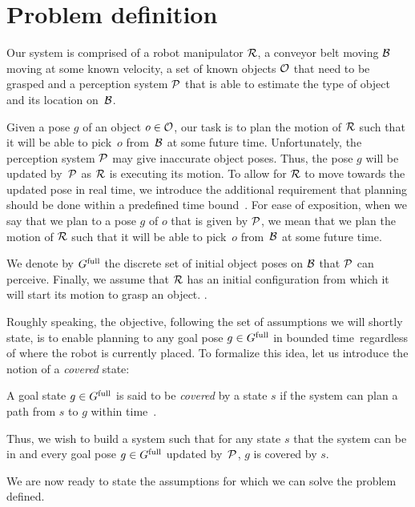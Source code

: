 \documentclass[conference]{IEEEtran}
\begin{document}
\section{Problem definition}
Our system is comprised of 
a robot manipulator $\mathcal{R}$,
a conveyor belt moving $\mathcal{B}$ moving at some known velocity,
a set of known objects $\mathcal{O}$ that need to be grasped and 
a perception system $\mathcal{P}$ that is able to estimate the type of object and its location on~$\mathcal{B}$.

Given a pose $g$ of an object $o \in \mathcal{O}$, our task is to plan the motion of $\mathcal{R}$ such that it will be able to pick~$o$ from~$\mathcal{B}$ at some future time.
%
Unfortunately, the perception system $\mathcal{P}$ may give inaccurate object poses.
Thus, the pose $g$ will be updated by~$\mathcal{P}$ as $\mathcal{R}$ is executing its motion. 
To allow for $\mathcal{R}$ to move towards the updated pose in real time, we introduce the additional requirement that planning should be done within a predefined time bound~\Tbound.
%
For ease of exposition, when we say that we plan to a pose $g$ of $o$ that is given by $\mathcal{P}$, 
we mean that we plan the motion of $\mathcal{R}$ such that it will be able to pick~$o$ from~$\mathcal{B}$ at some future time. 

%
We denote by $G^{\textrm{full}}$ the discrete set of initial object poses on $\mathcal{B}$ that $\mathcal{P}$ can perceive.
%
Finally, we assume that $\mathcal{R}$ has an initial configuration \Shome from which it will start its motion to grasp an object.
.

Roughly speaking, the objective, following the set of assumptions we will shortly state, is to enable planning to any goal pose $ g \in G^{\textrm{full}}$ in bounded time~\Tbound regardless of where the robot is currently placed.
To formalize this idea, let us introduce the notion of a \emph{covered} state:
\begin{definition}
    A goal state $g \in G^{\textrm{full}}$ is said to be \emph{covered} by a state $s$ if 
    the system can plan a path from $s$ to $g$ within time~\Tbound.
\end{definition}

Thus, we wish to build a system such that 
for any state $s$ that the system can be in 
and every goal pose $g \in G^{\textrm{full}}$ updated by~$\mathcal{P}$,
$g$ is covered by $s$.

We are now ready to state the assumptions for which we can solve the problem defined.
\end{document}
